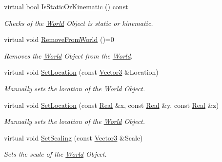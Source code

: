 \begin{DoxyCompactItemize}
virtual bool \hyperlink{classMezzanine_1_1WorldObject_ab5ebc61c589f90c990a9b4df29fd35f6}{IsStaticOrKinematic} () const 
\begin{DoxyCompactList}\small\item\em Checks of the \hyperlink{classMezzanine_1_1World}{World} Object is static or kinematic. \item\end{DoxyCompactList}\item 
\hypertarget{classMezzanine_1_1WorldObject_a67e3c05d50cc1ff631beecd37d87255a}{
virtual void \hyperlink{classMezzanine_1_1WorldObject_a67e3c05d50cc1ff631beecd37d87255a}{RemoveFromWorld} ()=0}
\label{classMezzanine_1_1WorldObject_a67e3c05d50cc1ff631beecd37d87255a}

\begin{DoxyCompactList}\small\item\em Removes the \hyperlink{classMezzanine_1_1World}{World} Object from the \hyperlink{classMezzanine_1_1World}{World}. \item\end{DoxyCompactList}\item 
virtual void \hyperlink{classMezzanine_1_1WorldObject_a461ab18e5d01e09b15f14aa3fc8964c8}{SetLocation} (const \hyperlink{classMezzanine_1_1Vector3}{Vector3} \&Location)
\begin{DoxyCompactList}\small\item\em Manually sets the location of the \hyperlink{classMezzanine_1_1World}{World} Object. \item\end{DoxyCompactList}\item 
virtual void \hyperlink{classMezzanine_1_1WorldObject_a453c9b26ba93d0640d95013944173fc4}{SetLocation} (const \hyperlink{namespaceMezzanine_a726731b1a7df72bf3583e4a97282c6f6}{Real} \&x, const \hyperlink{namespaceMezzanine_a726731b1a7df72bf3583e4a97282c6f6}{Real} \&y, const \hyperlink{namespaceMezzanine_a726731b1a7df72bf3583e4a97282c6f6}{Real} \&z)
\begin{DoxyCompactList}\small\item\em Manually sets the location of the \hyperlink{classMezzanine_1_1World}{World} Object. \item\end{DoxyCompactList}\item 
virtual void \hyperlink{classMezzanine_1_1WorldObject_a13b936fe377c4e5b6361b23c74e3a2d5}{SetScaling} (const \hyperlink{classMezzanine_1_1Vector3}{Vector3} \&Scale)
\begin{DoxyCompactList}\small\item\em Sets the scale of the \hyperlink{classMezzanine_1_1World}{World} Object. \item\end{DoxyCompactList}\item 

\end{DoxyCompactItemize}
